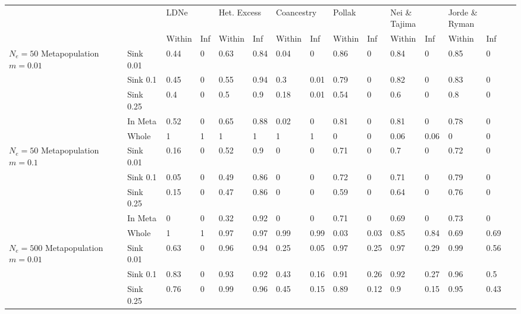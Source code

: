 \begin{landscape}
\begin{table}[h]
\begin{tabular}{ | l| l|| l| l| l| l| l| l| l| l| l| l| l| l| l| l| l| l| }
 \multicolumn{2}{l}{} & \multicolumn{2}{l}{LDNe} & \multicolumn{2}{l}{Het. Excess} & \multicolumn{2}{l}{Coancestry} & \multicolumn{2}{l}{Pollak} & \multicolumn{2}{l}{Nei \& Tajima} & \multicolumn{2}{l}{Jorde \& Ryman} & \multicolumn{4}{l}{} \\ \cline{1-14}
&  & Within & Inf & Within & Inf & Within & Inf & Within & Inf & Within & Inf & Within & Inf  &  \multicolumn{4}{l}{}  \\  \cline{1-14}
\multirow{5}{1cm}{$N_e = 50$ Metapopulation $m = 0.01$} & Sink 0.01 & 0.44 & 0 & 0.63 & 0.84 & 0.04 & 0 & 0.86 & 0 & 0.84 & 0 & 0.85 & 0  &  \multicolumn{4}{l}{} \\ \cline{2-14}
 & Sink 0.1  & 0.45 & 0 & 0.55 & 0.94 & 0.3 & 0.01 & 0.79 & 0 & 0.82 & 0 & 0.83 & 0  &  \multicolumn{4}{l}{} \\ \cline{2-14}
 & Sink 0.25  & 0.4 & 0 & 0.5 & 0.9 & 0.18 & 0.01 & 0.54 & 0 & 0.6 & 0 & 0.8 & 0  &  \multicolumn{4}{l}{} \\ \cline{2-14}
 & In Meta  & 0.52 & 0 & 0.65 & 0.88 & 0.02 & 0 & 0.81 & 0 & 0.81 & 0 & 0.78 & 0  &  \multicolumn{4}{l}{} \\ \cline{2-14}
 & Whole  & 1 & 1 & 1 & 1 & 1 & 1 & 0 & 0 & 0.06 & 0.06 & 0 & 0  &  \multicolumn{4}{l}{} \\ \cline{1-14}
\multirow{5}{1cm}{$N_e = 50$ Metapopulation $m = 0.1$} & Sink 0.01 & 0.16 & 0 & 0.52 & 0.9 & 0 & 0 & 0.71 & 0 & 0.7 & 0 & 0.72 & 0  &  \multicolumn{4}{l}{} \\ \cline{2-14}
 & Sink 0.1   & 0.05 & 0 & 0.49 & 0.86 & 0 & 0 & 0.72 & 0 & 0.71 & 0 & 0.79 & 0  &  \multicolumn{4}{l}{} \\ \cline{2-14}
 & Sink 0.25  & 0.15 & 0 & 0.47 & 0.86 & 0 & 0 & 0.59 & 0 & 0.64 & 0 & 0.76 & 0  &  \multicolumn{4}{l}{} \\ \cline{2-14}
 & In Meta  & 0 & 0 & 0.32 & 0.92 & 0 & 0 & 0.71 & 0 & 0.69 & 0 & 0.73 & 0  &  \multicolumn{4}{l}{} \\ \cline{2-14}
 & Whole  & 1 & 1 & 0.97 & 0.97 & 0.99 & 0.99 & 0.03 & 0.03 & 0.85 & 0.84 & 0.69 & 0.69  &  \multicolumn{4}{l}{} \\ \cline{1-14}
\multirow{5}{1cm}{$N_e = 500$ Metapopulation $m = 0.01$} & Sink 0.01 & 0.63 & 0 & 0.96 & 0.94 & 0.25 & 0.05 & 0.97 & 0.25 & 0.97 & 0.29 & 0.99 & 0.56  &  \multicolumn{4}{l}{} \\ \cline{2-14}
 & Sink 0.1   & 0.83 & 0 & 0.93 & 0.92 & 0.43 & 0.16 & 0.91 & 0.26 & 0.92 & 0.27 & 0.96 & 0.5  &  \multicolumn{4}{l}{} \\ \cline{2-14}
 & Sink 0.25  & 0.76 & 0 & 0.99 & 0.96 & 0.45 & 0.15 & 0.89 & 0.12 & 0.9 & 0.15 & 0.95 & 0.43  &  \multicolumn{4}{l}{} \\ \cline{2-14}

\end{tabular}
\end{table}
\end{landscape}
